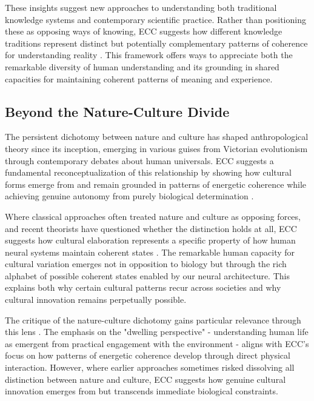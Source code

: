 These insights suggest new approaches to understanding both traditional knowledge systems and contemporary scientific practice. Rather than positioning these as opposing ways of knowing, ECC suggests how different knowledge traditions represent distinct but potentially complementary patterns of coherence for understanding reality \cite{laughlin1992brain}. This framework offers ways to appreciate both the remarkable diversity of human understanding and its grounding in shared capacities for maintaining coherent patterns of meaning and experience.

\subsection{Beyond the Nature-Culture Divide}

The persistent dichotomy between nature and culture has shaped anthropological theory since its inception, emerging in various guises from Victorian evolutionism through contemporary debates about human universals. ECC suggests a fundamental reconceptualization of this relationship by showing how cultural forms emerge from and remain grounded in patterns of energetic coherence while achieving genuine autonomy from purely biological determination \cite{descola2005beyond}.

Where classical approaches often treated nature and culture as opposing forces, and recent theorists have questioned whether the distinction holds at all, ECC suggests how cultural elaboration represents a specific property of how human neural systems maintain coherent states \cite{latour1993modern}. The remarkable human capacity for cultural variation emerges not in opposition to biology but through the rich alphabet of possible coherent states enabled by our neural architecture. This explains both why certain cultural patterns recur across societies and why cultural innovation remains perpetually possible.

The critique of the nature-culture dichotomy gains particular relevance through this lens \cite{ingold2000perception}. The emphasis on the "dwelling perspective" - understanding human life as emergent from practical engagement with the environment - aligns with ECC's focus on how patterns of energetic coherence develop through direct physical interaction. However, where earlier approaches sometimes risked dissolving all distinction between nature and culture, ECC suggests how genuine cultural innovation emerges from but transcends immediate biological constraints.

